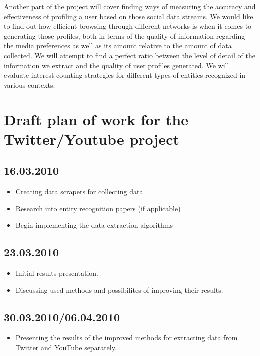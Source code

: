 \documentclass{article}
\begin{document}
Another part of the project will cover finding ways of measuring the accuracy and effectiveness of profiling a user based on those social data streams. We would like to find out how efficient browsing through different networks is when it comes to generating those profiles, both in terms of the quality of information regarding the media preferences as well as its amount relative to the amount of data collected. We will attempt to find a perfect ratio between the level of detail of the information we extract and the quality of user profiles generated. We will evaluate interest counting strategies for different types of entities recognized in various contexts.  

\section{Draft plan of work for the Twitter/Youtube project}

\subsection{16.03.2010}
\begin{itemize}
\item{Creating data scrapers for collecting data}
\item{Research into entity recognition papers (if applicable)}
\item{Begin implementing the data extraction algorithms}
\end{itemize}

\subsection{23.03.2010}
\begin{itemize}
\item{Initial results presentation.}
\item{Discussing used methods and possibilites of improving their results.}
\end{itemize}

\subsection{30.03.2010/06.04.2010}
\begin{itemize}
\item{Presenting the results of the improved methods for extracting data
from Twitter and YouTube separately.}
\end{itemize}
\end{document}
